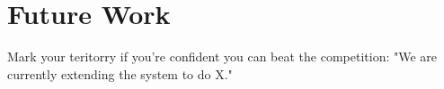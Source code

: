 \section{Future Work}
\label{sec:future}

Mark your teritorry if you're confident you can beat the competition: "We are currently extending
the system to do X."
